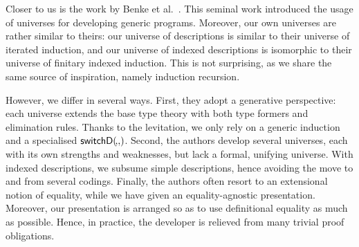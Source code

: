 Closer to us is the work by Benke et
al.~\cite{benke:universe-generic-prog}. This seminal work introduced
the usage of universes for developing generic programs. Moreover, our
own universes are rather similar to theirs: our universe of
descriptions is similar to their universe of iterated induction, and
our universe of indexed descriptions is isomorphic to their universe of
finitary indexed induction. This is not surprising, as we share the
same source of inspiration, namely induction recursion.

However, we differ in several ways. First, they adopt a generative
perspective: each universe extends the base type theory with both type
formers and elimination rules. Thanks to the levitation, we only rely
on a generic induction and a specialised
$\switchD{\!}{\!}{\!}$. Second, the authors develop several universes,
each with its own strengths and weaknesses, but lack a formal,
unifying universe. With indexed descriptions, we subsume simple
descriptions, hence avoiding the move to and from several
codings. Finally, the authors often resort to an extensional notion of
equality, while we have given an equality-agnostic
presentation. Moreover, our presentation is arranged so as to use
definitional equality as much as possible. Hence, in practice, the
developer is relieved from many trivial proof obligations.
